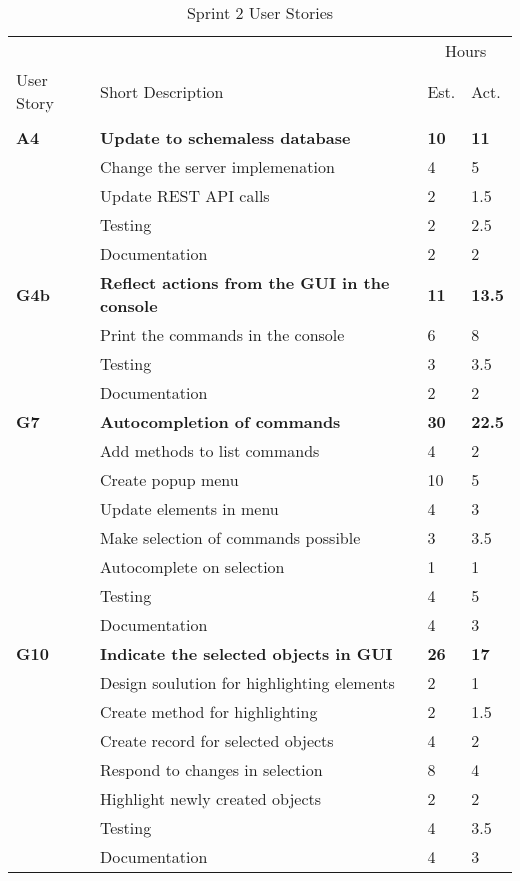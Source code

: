 \begin{table}
\caption{Sprint 2 User Stories}
\centering
\begin{tabular}{ l p{8cm} l l }
\hline 
			&				&\multicolumn{2}{c}{Hours}			\\
 User Story	& Short Description		&Est.		&Act.	                               \\ 
\hline \\ [-2.0ex]
 \bf{A4}     &\bf{Update to schemaless database}		&\bf{10}		&\bf{11}          \\ 
		  &Change the server implemenation		&4			&5		\\
		  &Update REST API calls					&2			&1.5		\\
		  &Testing							&2			&2.5		\\
		  &Documentation						&2			&2		\\

 \bf{G4b}     &\bf{Reflect actions from the GUI in the console} 		&\bf{11}		&\bf{13.5}               \\ 
		  &Print the commands in the console				&6			&8		\\
		  &Testing									&3			&3.5		\\
		  &Documentation								&2			&2		\\

 \bf{G7}     &\bf{Autocompletion of commands} 	&\bf{30}		&\bf{22.5}		     \\ 
		  &Add methods to list commands		&4			&2		\\
		  &Create popup menu				&10			&5		\\
		  &Update elements in menu			&4			&3		\\
		  &Make selection of commands possible&3			&3.5		\\
		  &Autocomplete on selection			&1			&1		\\
		  &Testing						&4			&5		\\
		  &Documentation					&4			&3		\\

 \bf{G10}   &\bf{Indicate the selected objects in GUI}		&\bf{26}		&\bf{17}		     \\ 
		  &Design soulution for highlighting elements	&2			&1		\\
		  &Create method for highlighting				&2			&1.5		\\
		  &Create record for selected objects			&4			&2		\\
		  &Respond to changes in selection				&8			&4		\\
		  &Highlight newly created objects				&2			&2		\\
		  &Testing								&4			&3.5		\\
		  &Documentation							&4			&3		\\


\end{tabular}
\end{table}
